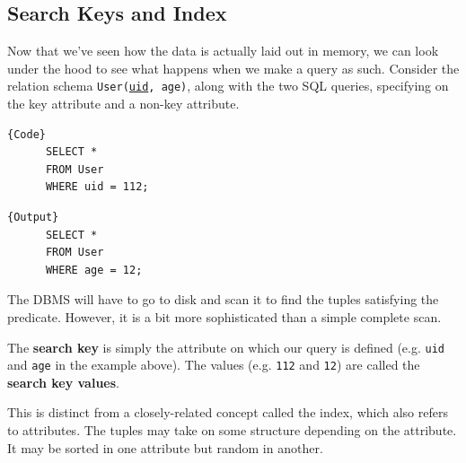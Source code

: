 \subsection{Search Keys and Index} 

  Now that we've seen how the data is actually laid out in memory, we can look under the hood to see what happens when we make a query as such. Consider the relation schema \texttt{User(\underline{uid}, age)}, along with the two SQL queries, specifying on the key attribute and a non-key attribute. 
  
  \noindent\begin{minipage}{.5\textwidth}
    \begin{lstlisting}[]{Code}
      SELECT * 
      FROM User 
      WHERE uid = 112;
    \end{lstlisting}
    \end{minipage}
    \hfill
    \begin{minipage}{.49\textwidth}
    \begin{lstlisting}[]{Output}
      SELECT * 
      FROM User 
      WHERE age = 12;
    \end{lstlisting}
  \end{minipage} 

  The DBMS will have to go to disk and scan it to find the tuples satisfying the predicate. However, it is a bit more sophisticated than a simple complete scan. 

  \begin{definition}
    The \textbf{search key} is simply the attribute on which our query is defined (e.g. \texttt{uid} and \texttt{age} in the example above). The values (e.g. \texttt{112} and \texttt{12}) are called the \textbf{search key values}. 
  \end{definition} 

  This is distinct from a closely-related concept called the index, which also refers to attributes. The tuples may take on some structure depending on the attribute. It may be sorted in one attribute but random in another. 

